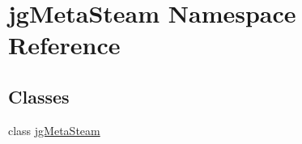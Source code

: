 \hypertarget{namespacejg_meta_steam}{\section{jg\+Meta\+Steam Namespace Reference}
\label{namespacejg_meta_steam}
}
\subsection*{Classes}
\begin{DoxyCompactItemize}
\item 
class \hyperlink{classjg_meta_steam_1_1jg_meta_steam}{jg\+Meta\+Steam}
\end{DoxyCompactItemize}
